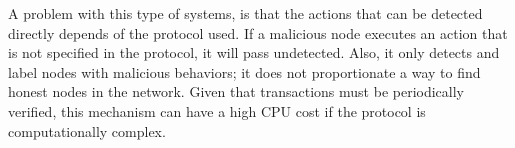 A problem with this type of systems, is that the actions that can be detected
directly depends of the protocol used. If a malicious node executes an action
that is not specified in the protocol, it will pass undetected. Also, it only
detects and label nodes with malicious behaviors; it does not proportionate a
way to find honest nodes in the network.
Given that transactions must be periodically verified, this mechanism can have a high
CPU cost if the protocol is computationally complex.
 

